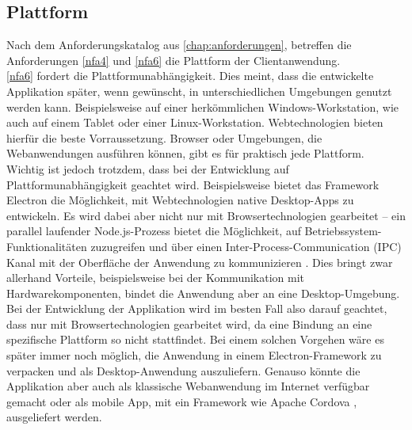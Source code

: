 \subsection{Plattform}
\label{subs:plattform}

Nach dem Anforderungskatalog aus \autoref{chap:anforderungen}, betreffen die Anforderungen
\ref{nfa4} und \ref{nfa6} die Plattform der Clientanwendung.\\

\ref{nfa6} fordert die Plattformunabhängigkeit. Dies meint, dass die entwickelte
Applikation später, wenn gewünscht, in unterschiedlichen Umgebungen genutzt werden kann.
Beispielsweise auf einer herkömmlichen Windows-Workstation, wie auch auf einem
Tablet oder einer Linux-Workstation. Webtechnologien bieten hierfür die beste Vorraussetzung. 
Browser oder Umgebungen, die Webanwendungen ausführen können, gibt es für praktisch 
jede Plattform. Wichtig ist jedoch trotzdem, dass bei der Entwicklung auf
Plattformunabhängigkeit geachtet wird. Beispielsweise bietet das Framework Electron die 
Möglichkeit, mit Webtechnologien native Desktop-Apps zu entwickeln. Es wird dabei aber nicht
nur mit Browsertechnologien gearbeitet -- ein parallel laufender Node.js-Prozess bietet
die Möglichkeit, auf Betriebssystem-Funktionalitäten zuzugreifen 
und über einen Inter-Process-Communication (IPC) Kanal mit der Oberfläche der Anwendung zu
kommunizieren \cite{electron-architecture}. Dies bringt zwar allerhand Vorteile, 
beispielsweise bei der Kommunikation mit Hardwarekomponenten, bindet die Anwendung aber an eine Desktop-Umgebung. 
Bei der Entwicklung der Applikation wird im besten Fall also darauf geachtet, dass nur mit 
Browsertechnologien gearbeitet wird, da eine Bindung an eine spezifische Plattform so 
nicht stattfindet. Bei einem solchen Vorgehen wäre es später immer noch möglich, 
die Anwendung in einem Electron-Framework zu verpacken und als Desktop-Anwendung auszuliefern. 
Genauso könnte die Applikation aber auch als klassische Webanwendung im Internet verfügbar gemacht oder 
als mobile App, mit ein Framework wie Apache Cordova \cite{cordova}, ausgeliefert werden.\\

